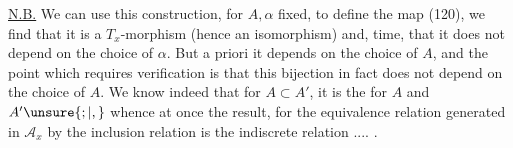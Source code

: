 \uline{N.B.} We can use this construction, for $A,\alpha$ fixed,
to define the map (120), we find that it is a
$T_x$-morphism (hence an isomorphism) and,
time, that it does not depend on the choice of $\alpha$.
But a priori it depends  on the choice of $A$, and the point which
requires verification is that this bijection in fact does not depend on the choice
of $A$. We know indeed that for $A\subset A'$, it is the
 for $A$ and $A'\unsure{;|,}$
whence at once the result, for the equivalence relation generated in
$\mathcal{A}_x$ by the inclusion relation is the indiscrete relation .... .


